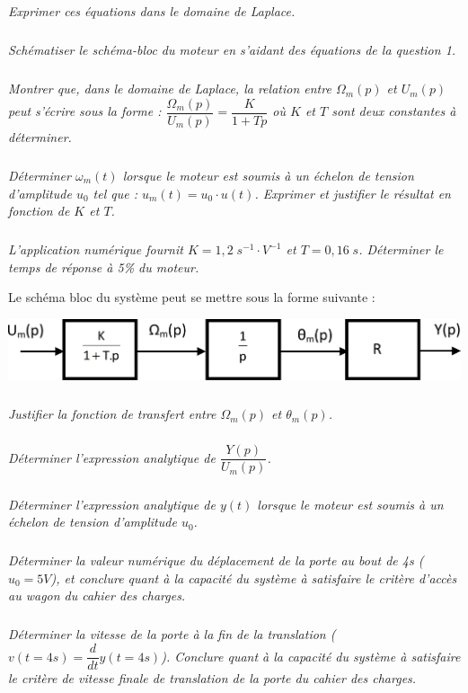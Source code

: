 \documentclass[10pt,fleqn]{article} %
\begin{document}
\begin{multicols}{2}
\subparagraph{}
\textit{Exprimer ces équations dans le domaine de Laplace.}

\subparagraph{}
\textit{Schématiser le schéma-bloc du moteur en s’aidant des équations de la question 1.}

\subparagraph{}
\textit{Montrer que, dans le domaine de Laplace, la relation entre $\Omega_m (p)$ et $U_m (p)$ peut s'écrire sous la forme : $\dfrac{\Omega_m(p)}{U_m(p)} = \dfrac{K}{1+Tp} $ où $K$ et $T$ sont deux constantes à déterminer.}

\subparagraph{}
\textit{Déterminer $\omega_m (t)$ lorsque le moteur est soumis à un échelon de tension d'amplitude $u_0$ tel que : $u_m (t)= u_0 \cdot u(t)$. Exprimer et justifier le résultat en fonction de $K$ et $T$.}

\subparagraph{}
\textit{L'application numérique fournit $K=1,2 \; s^{-1}\cdot V^{-1}$ et $T=0,16\;s$. Déterminer le temps de réponse à 5\% du moteur.}

 Le schéma bloc du système peut se mettre sous la forme suivante :

 \begin{center}
\includegraphics[width=.5\textwidth]{images/fig_04}
\end{center} 

\subparagraph{}
\textit{Justifier la fonction de transfert entre $\Omega_m(p)$ et $\theta_m (p)$.}  

\subparagraph{}
\textit{Déterminer l'expression analytique de $\dfrac{Y(p)}{U_m(p)}$.}

\subparagraph{}
\textit{Déterminer l'expression analytique de $y(t)$ lorsque le moteur est soumis à un échelon de tension d'amplitude $u_0$.}  

\subparagraph{}
\textit{Déterminer la valeur numérique du déplacement de la porte au bout de 4s ($u_0 =5V$), et conclure quant à la capacité du système à satisfaire le critère d'accès au wagon du cahier des charges.}

\subparagraph{}
\textit{Déterminer la vitesse de la porte à la fin de la translation ($v(t=4s)= \dfrac{d}{dt}y(t=4s)$). Conclure quant à la capacité du système à satisfaire le critère de vitesse finale de translation de la porte du cahier des charges. }
\end{multicols}
\end{document}
